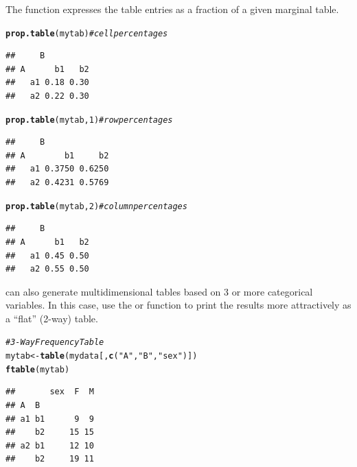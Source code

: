 \documentclass[11pt]{book}\usepackage[]{graphicx}\usepackage[]{color}
\makeatletter
\newcommand{\hlnum}[1]{\textcolor[rgb]{0.686,0.059,0.569}{#1}}%
\newcommand{\hlstr}[1]{\textcolor[rgb]{0.192,0.494,0.8}{#1}}%
\newcommand{\hlcom}[1]{\textcolor[rgb]{0.678,0.584,0.686}{\textit{#1}}}%
\newcommand{\hlstd}[1]{\textcolor[rgb]{0.345,0.345,0.345}{#1}}%
\newcommand{\hlkwb}[1]{\textcolor[rgb]{0.69,0.353,0.396}{#1}}%
\newcommand{\hlkwd}[1]{\textcolor[rgb]{0.737,0.353,0.396}{\textbf{#1}}}%
\newenvironment{kframe}{%
 \def\at@end@of@kframe{}%
 \ifinner\ifhmode%
  \def\at@end@of@kframe{\end{minipage}}%
  \begin{minipage}{\columnwidth}%
 \fi\fi%
 \def\FrameCommand##1{\hskip\@totalleftmargin \hskip-\fboxsep
 \colorbox{shadecolor}{##1}\hskip-\fboxsep
     \hskip-\linewidth \hskip-\@totalleftmargin \hskip\columnwidth}%
 \MakeFramed {\advance\hsize-\width
   \@totalleftmargin\z@ \linewidth\hsize
   \@setminipage}}%
 {\par\unskip\endMakeFramed%
 \at@end@of@kframe}
\newenvironment{knitrout}{}{} %
\renewenvironment{knitrout}{\small\renewcommand{\baselinestretch}{.85}}{} %
\makeatother
\begin{document}
The function  expresses the table entries as a fraction of
a given marginal table.  
\begin{knitrout}
\color{fgcolor}\begin{kframe}
\begin{alltt}
\hlkwd{prop.table}\hlstd{(mytab)}        \hlcom{# cell percentages}
\end{alltt}
\begin{verbatim}
##     B
## A      b1   b2
##   a1 0.18 0.30
##   a2 0.22 0.30
\end{verbatim}
\begin{alltt}
\hlkwd{prop.table}\hlstd{(mytab,} \hlnum{1}\hlstd{)}     \hlcom{# row percentages}
\end{alltt}
\begin{verbatim}
##     B
## A        b1     b2
##   a1 0.3750 0.6250
##   a2 0.4231 0.5769
\end{verbatim}
\begin{alltt}
\hlkwd{prop.table}\hlstd{(mytab,} \hlnum{2}\hlstd{)}     \hlcom{# column percentages}
\end{alltt}
\begin{verbatim}
##     B
## A      b1   b2
##   a1 0.45 0.50
##   a2 0.55 0.50
\end{verbatim}
\end{kframe}
\end{knitrout}


 can  also  generate  multidimensional  tables  based  on  3  or  more
categorical variables. In  this case, use  the   or 
function to print the
results more attractively as a ``flat'' (2-way) table.

\begin{knitrout}
\color{fgcolor}\begin{kframe}
\begin{alltt}
\hlcom{# 3-Way Frequency Table}
\hlstd{mytab} \hlkwb{<-} \hlkwd{table}\hlstd{(mydata[,}\hlkwd{c}\hlstd{(}\hlstr{"A"}\hlstd{,} \hlstr{"B"}\hlstd{,} \hlstr{"sex"}\hlstd{)])}
\hlkwd{ftable}\hlstd{(mytab)}
\end{alltt}
\begin{verbatim}
##       sex  F  M
## A  B           
## a1 b1      9  9
##    b2     15 15
## a2 b1     12 10
##    b2     19 11
\end{verbatim}
\end{kframe}
\end{knitrout}
\end{document}
